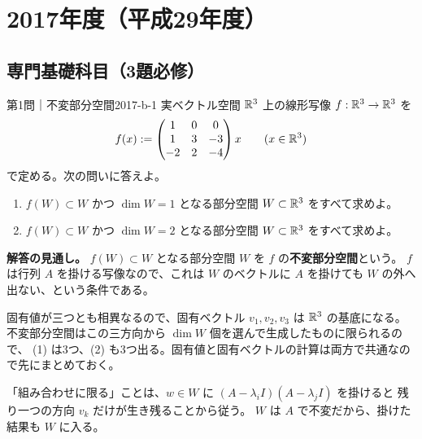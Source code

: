\chapter{2017年度（平成29年度）}
\label{ch:2017}

\section{専門基礎科目（3題必修）}

\begin{problem}{第1問｜不変部分空間}{2017-b-1}
実ベクトル空間 $\mathbb{R}^3$ 上の線形写像 $f:\mathbb{R}^3\to\mathbb{R}^3$ を
\[
f(x):=\begin{pmatrix}1&0&0\\1&3&-3\\-2&2&-4\end{pmatrix}x
\qquad(x\in\mathbb{R}^3)
\]
で定める。次の問いに答えよ。
\begin{enumerate}
  \item[(1)] $f(W)\subset W$ かつ $\dim W=1$ となる部分空間 $W\subset\mathbb{R}^3$ をすべて求めよ。
  \item[(2)] $f(W)\subset W$ かつ $\dim W=2$ となる部分空間 $W\subset\mathbb{R}^3$ をすべて求めよ。
\end{enumerate}
\end{problem}
\begin{memo*}
\textbf{解答の見通し。}
$f(W)\subset W$ となる部分空間 $W$ を $f$ の\textbf{不変部分空間}という。
$f$ は行列 $A$ を掛ける写像なので、これは $W$ のベクトルに $A$ を掛けても
$W$ の外へ出ない、という条件である。

固有値が三つとも相異なるので、固有ベクトル $v_1,v_2,v_3$ は $\mathbb{R}^3$ の基底になる。
不変部分空間はこの三方向から $\dim W$ 個を選んで生成したものに限られるので、
(1) は3つ、(2) も3つ出る。固有値と固有ベクトルの計算は両方で共通なので先にまとめておく。

「組み合わせに限る」ことは、$w\in W$ に $(A-\lambda_iI)(A-\lambda_jI)$ を掛けると
残り一つの方向 $v_k$ だけが生き残ることから従う。
$W$ は $A$ で不変だから、掛けた結果も $W$ に入る。
\end{memo*}
